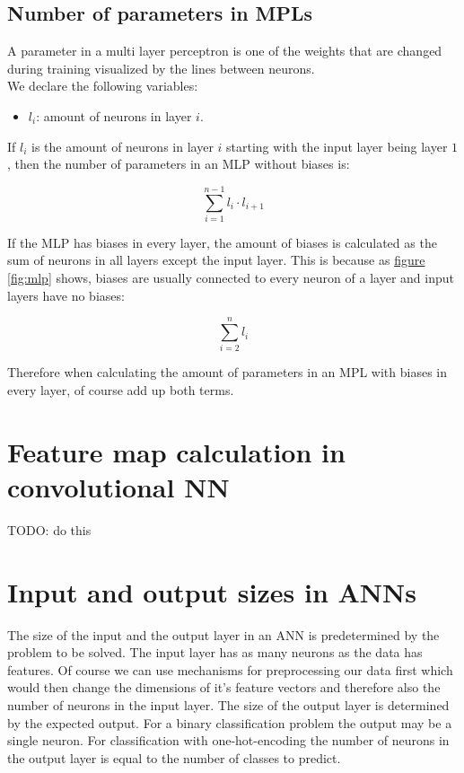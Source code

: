 \subsection{Number of parameters in MPLs}

A parameter in a multi layer perceptron is one of the weights that are changed during training visualized by the lines between neurons.\\

We declare the following variables:
\begin{itemize}
    \item $l_{i}$: amount of neurons in layer $i$.
\end{itemize}

If $l_{i}$ is the amount of neurons in layer $i$ starting with the input layer being layer $1$, then the number of parameters in an MLP without biases is:

$$
    \sum_{i=1}^{n-1}l_{i}\cdot{l_{i+1}}
$$

If the MLP has biases in every layer, the amount of biases is calculated as the sum of neurons in all layers except the input layer. This is because as \hyperref[fig:mlp]{figure \ref*{fig:mlp}} shows, biases are usually connected to every neuron of a layer and input layers have no biases:

$$
    \sum_{i=2}^{n}l_{i}
$$

Therefore when calculating the amount of parameters in an MPL with biases in every layer, of course add up both terms.

\section{Feature map calculation in convolutional NN}

TODO: do this

\section{Input and output sizes in ANNs}

The size of the input and the output layer in an ANN is predetermined by the problem to be solved. The input layer has as many neurons as the data has features. Of course we can use mechanisms for preprocessing our data first which would then change the dimensions of it's feature vectors and therefore also the number of neurons in the input layer. The size of the output layer is determined by the expected output. For a binary classification problem the output may be a single neuron. For classification with one-hot-encoding the number of neurons in the output layer is equal to the number of classes to predict.

